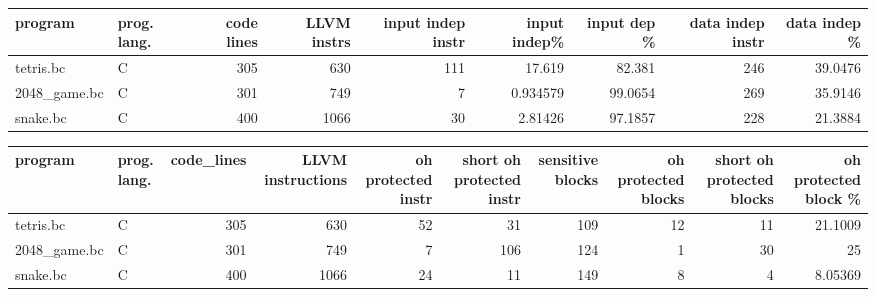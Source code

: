 \documentclass{article}
\begin{document}
\begin{table}[ht]
\centering
\begin{adjustbox}{width=1.3\textwidth}
\begin{tabular}{llrrrrrrr}
\hline
 program& prog. lang.   &   code lines &   LLVM instrs &   input indep instr &   input indep\% &   input dep \% &   data indep instr &   data indep \% \\
\hline
 tetris.bc    & C             &          305 &           630 &                 111 &      17.619    &       82.381  &                246 &        39.0476 \\
 2048\_game.bc & C             &          301 &           749 &                   7 &       0.934579 &       99.0654 &                269 &        35.9146 \\
 snake.bc     & C             &          400 &          1066 &                  30 &       2.81426  &       97.1857 &                228 &        21.3884 \\
\hline
\end{tabular}
\end{adjustbox}
\end{table}

\begin{table}[ht]
\centering
\begin{adjustbox}{width=1.3\textwidth}
\begin{tabular}{llrrrrrrrr}
\hline
 program      & prog. lang.   &   code\_lines &   LLVM instructions &   oh protected instr &   short oh protected instr &   sensitive blocks &   oh protected blocks &   short oh protected blocks &   oh protected block \% \\
\hline
 tetris.bc    & C             &          305 &                 630 &                   52 &                         31 &                109 &                    12 &                          11 &               21.1009  \\
 2048\_game.bc & C             &          301 &                 749 &                    7 &                        106 &                124 &                     1 &                          30 &               25       \\
 snake.bc     & C             &          400 &                1066 &                   24 &                         11 &                149 &                     8 &                           4 &                8.05369 \\
\hline
\end{tabular}
\end{adjustbox}
\end{table}
\end{document}
